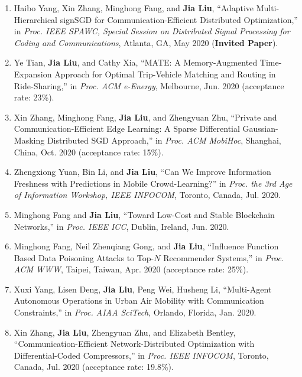 \documentclass[overlapped,line,letterpaper]{res1}
\begin{document}
\begin{resume}
\begin{enumerate}
\vspace*{.08in} \item Haibo Yang, Xin Zhang, Minghong Fang, and {\bf Jia Liu}, ``Adaptive Multi-Hierarchical signSGD for Communication-Efficient Distributed Optimization,'' in {\em Proc. IEEE SPAWC, Special Session on Distributed Signal Processing for Coding and Communications}, Atlanta, GA, May 2020 ({\bf Invited Paper}).

\vspace*{.08in} \item Ye Tian, {\bf Jia Liu}, and Cathy Xia, ``MATE: A Memory-Augmented Time-Expansion Approach for Optimal Trip-Vehicle Matching and Routing in Ride-Sharing,'' in {\em Proc. ACM e-Energy}, Melbourne, Jun. 2020 (acceptance rate: 23\%).

\vspace*{.08in} \item Xin Zhang, Minghong Fang, {\bf Jia Liu}, and Zhengyuan Zhu, ``Private and Communication-Efficient Edge Learning: A Sparse Differential Gaussian-Masking Distributed SGD Approach,'' in {\em Proc. ACM MobiHoc}, Shanghai, China, Oct. 2020 (acceptance rate: 15\%).

\vspace*{.08in} \item Zhengxiong Yuan, Bin Li, and {\bf Jia Liu}, ``Can We Improve Information Freshness with Predictions in Mobile Crowd-Learning?'' in {\em Proc. the 3rd Age of Information Workshop, IEEE INFOCOM}, Toronto, Canada, Jul. 2020.

\vspace*{.08in} \item Minghong Fang and {\bf Jia Liu}, ``Toward Low-Cost and Stable Blockchain Networks,'' in {\em Proc. IEEE ICC}, Dublin, Ireland, Jun. 2020.

\vspace*{.08in} \item Minghong Fang, Neil Zhenqiang Gong, and {\bf Jia Liu}, ``Influence Function Based Data Poisoning Attacks to Top-$N$ Recommender Systems,'' in {\em Proc. ACM WWW}, Taipei, Taiwan, Apr. 2020 (acceptance rate: 25\%).

\vspace*{.08in} \item Xuxi Yang, Lisen Deng, {\bf Jia Liu}, Peng Wei, Husheng Li, ``Multi-Agent Autonomous Operations in Urban Air Mobility with Communication Constraints,'' in {\em Proc. AIAA SciTech}, Orlando, Florida, Jan. 2020.

\vspace*{.08in} \item Xin Zhang, {\bf Jia Liu}, Zhengyuan Zhu, and Elizabeth Bentley, ``Communication-Efficient Network-Distributed Optimization with Differential-Coded Compressors,'' in {\em Proc. IEEE INFOCOM}, Toronto, Canada, Jul. 2020 (acceptance rate: 19.8\%).


\end{enumerate}
\end{resume}
\end{document}
